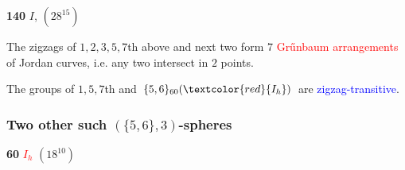 \documentclass{beamer}
\begin{document}
\begin{frame}
\begin{center}
\begin{minipage}{2.2cm}
{\bf 140}   $I$, $(28^{15})$
\end{minipage}
\end{center}
The zigzags of $1,2,3,5,7$th above  and next two  form $7$ 
\textcolor{red}{Gr\H{u}nbaum}  \textcolor{red}{arrangements} of
Jordan curves, i.e.  any two intersect in $2$ 
points. 

The groups of $1,5,7$th and  $\{5,6\}_{60} (\textcolor{red}{I_{h}})$
are \textcolor{blue}{zigzag-transitive}.
\end{frame}

\begin{frame}\frametitle{Two other such  $(\{5,6\},3)$-spheres}
\vspace{-2.5mm}
\begin{center} 
\begin{minipage}{4.4cm}
\centering
{}\par
{\bf 60} \textcolor{red}{$I_{h}$} $(18^{10})$
\end{minipage}
\begin{minipage}{4.4cm}
\centering

\end{minipage}
\end{center}
\end{frame}
\end{document}
